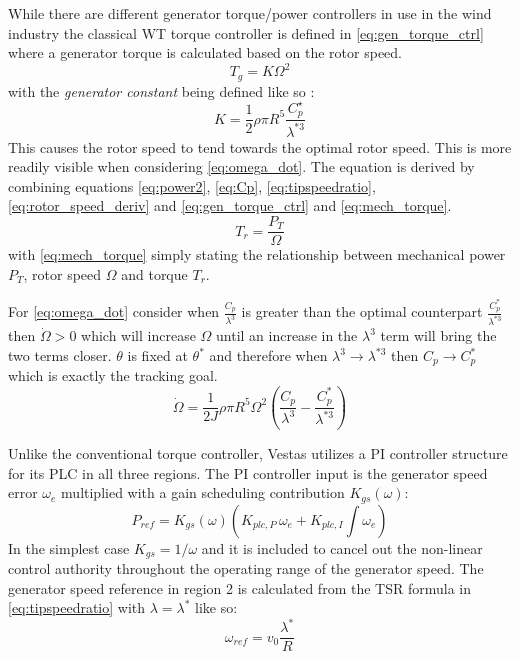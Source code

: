 While there are different generator torque/power controllers in use in the wind industry the classical WT torque controller is defined in \cref{eq:gen_torque_ctrl} where a generator torque is calculated based on the rotor speed.
\begin{equation}\label{eq:gen_torque_ctrl}
	T_g = K \Omega^2
\end{equation}
with the \textit{generator constant} being defined like so \cite{Pao2009}:
\begin{equation}\label{eq:gen_torque_const}
	K = \dfrac{1}{2} \rho \pi R^5 \dfrac{C_p^\star}{\lambda^{*3}}
\end{equation}
This causes the rotor speed to tend towards the optimal rotor speed. This is more readily visible when considering \cref{eq:omega_dot}. The equation is derived by combining equations \cref{eq:power2}, \cref{eq:Cp}, \cref{eq:tipspeedratio}, \cref{eq:rotor_speed_deriv} and \cref{eq:gen_torque_ctrl} and \cref{eq:mech_torque}.
\begin{equation}\label{eq:mech_torque}
	T_r = \dfrac{P_T}{\Omega}
\end{equation}
with \cref{eq:mech_torque} simply stating the relationship between mechanical power $ P_T $, rotor speed $ \Omega $ and torque $ T_r $.

For \cref{eq:omega_dot} consider when $ \frac{C_p}{\lambda^3} $ is greater than the optimal counterpart $ \frac{C_p^*}{\lambda^{*3}} $ then $ \dot{\Omega} > 0 $ which will increase $ \Omega $ until an increase in the $ \lambda^3 $ term will bring the two terms closer. $ \theta $ is fixed at $ \theta^* $ and therefore when $ \lambda^3 \rightarrow \lambda^{*3} $ then $ C_p \rightarrow C_p^* $ which is exactly the tracking goal.
\begin{equation}\label{eq:omega_dot}
	\dot{\Omega} = \dfrac{1}{2 J} \rho \pi R^5 \Omega^2 \left( \dfrac{C_p}{\lambda^3} - \dfrac{C_p^*}{\lambda^{*3}} \right)
\end{equation}


\medskip
Unlike the conventional torque controller, Vestas utilizes a PI controller structure for its PLC in all three regions. The PI controller input is the generator speed error $ \omega_e $ multiplied with a gain scheduling contribution $ K_{gs}(\omega) $:
\begin{equation}\label{eq:pi_plc_ctrl}
	P_{ref} = K_{gs}(\omega) \left(K_{plc,P} \, \omega_e + K_{plc,I} \int \omega_e\right)
\end{equation}
In the simplest case $ K_{gs} = 1/\omega $ and it is included to cancel out the non-linear control authority throughout the operating range of the generator speed.
The generator speed reference in region 2 is calculated from the TSR formula in \cref{eq:tipspeedratio} with $ \lambda = \lambda^* $ like so:
\begin{equation}\label{eq:omega_ref_from_tsr}
	\omega_{ref} = v_0 \dfrac{\lambda^*}{R}
\end{equation} 

